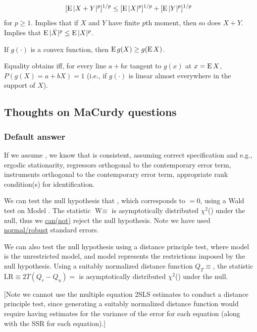 \documentclass[8pt,letterpaper, landscape]{extarticle} %
\begin{document}
\begin{multicols}{3}
\begin{description}
$$ [\operatorname{E} |X+Y|^p]^{1/p} \leq [\operatorname{E} |X|^p]^{1/p} + [\operatorname{E} |Y|^p]^{1/p} $$
for $ p \geq 1 $. Implies that if $ X $ and $ Y $ have finite $ p $th moment, then so does $ X + Y $. Implies that $ \operatorname{E} |\bar{X}|^p \leq \operatorname{E} |X|^p $.

 If $ g (\cdot) $ is a convex function, then $ \operatorname{E} g(X) \geq g(\operatorname{E} X) $.

Equality obtains iff, for every line $ a + bx $ tangent to $ g(x) $ at $ x = \operatorname{E} X $, $ P (g(X) = a + bX) = 1 $ (i.e., if $ g (\cdot) $ is linear almost everywhere in the support of $ X $).

\subsection{Thoughts on MaCurdy questions}
\subsubsection*{Default answer}
If we assume \makebox[0.5in]{\hrulefill}, we know that \makebox[0.5in]{\hrulefill} is consistent, assuming correct specification and e.g., ergodic stationarity, regressors orthogonal to the contemporary error term, instruments orthogonal to the contemporary error term, appropriate rank condition(s) for identification.

We can test the null hypothesis that \makebox[0.5in]{\hrulefill}, which corresponds to \makebox[0.5in]{\hrulefill}$ =0 $, using a Wald test on Model \makebox[0.1in]{\hrulefill}. The statistic $ \text{W} \equiv $\makebox[0.5in]{\hrulefill} is asymptotically distributed $ \chi^2 $(\makebox[0.1in]{\hrulefill}) under the null, thus we \underline{can(not)} reject the null hypothesis. Note we have used \underline{normal/robust} standard errors.

We can also test the null hypothesis using a distance principle test, where model \makebox[0.1in]{\hrulefill} is the unrestricted model, and model \makebox[0.1in]{\hrulefill} represents the restrictions imposed by the null hypothesis. Using a suitably normalized distance function $ Q_T \equiv $\makebox[0.5in]{\hrulefill}, the statistic $ \text{LR} \equiv 2T (Q_r - Q_u) = $ \makebox[0.5in]{\hrulefill} is asymptotically distributed $ \chi^2 $(\makebox[0.1in]{\hrulefill}) under the null.

[Note we cannot use the multiple equation 2SLS estimates to conduct a distance principle test, since generating a suitably normalized distance function would require having estimates for the variance of the error for each equation (along with the SSR for each equation).]


\end{description}
\end{multicols}
\end{document}
